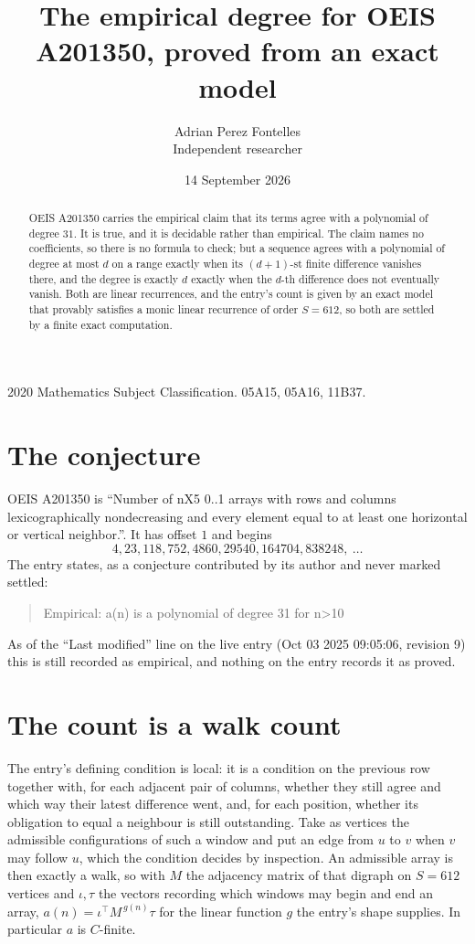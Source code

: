 \documentclass[11pt,a4paper]{article}
\title{The empirical degree for OEIS A201350, proved from an exact model}
\author{Adrian Perez Fontelles\\ \small Independent researcher}
\date{14 September 2026}
\theoremstyle{plain}
\theoremstyle{definition}
\begin{document}
\maketitle

\begin{abstract}
OEIS A201350 carries the empirical claim that its terms agree with a polynomial of degree $31$.
It is true, and it is decidable rather than empirical. The claim names no coefficients, so
there is no formula to check; but a sequence agrees with a polynomial of degree at most $d$ on
a range exactly when its $(d+1)$-st finite difference vanishes there, and the degree is exactly
$d$ exactly when the $d$-th difference does not eventually vanish. Both are linear recurrences,
and the entry's count is given by an exact model that provably satisfies a monic linear
recurrence of order $S=612$, so both are settled by a finite exact computation.
\end{abstract}

\noindent\small 2020 Mathematics Subject Classification. 05A15, 05A16, 11B37.\normalsize

\section{The conjecture}

OEIS A201350 is ``Number of nX5 0..1 arrays with rows and columns lexicographically nondecreasing and every element equal to at least one horizontal or vertical neighbor.''. It has offset $1$ and begins
\[
4, 23, 118, 752, 4860, 29540, 164704, 838248,\ \dots
\]
The entry states, as a conjecture contributed by its author and never marked settled:
\begin{quote}
Empirical: a(n) is a polynomial of degree 31 for n>10
\end{quote}
As of the ``Last modified'' line on the live entry (Oct 03 2025 09:05:06, revision 9)
this is still recorded as empirical, and nothing on the entry records it as proved.

\section{The count is a walk count}

The entry's defining condition is local: it is a condition on the previous row together with, for each adjacent pair of columns, whether they still agree and which way their latest difference went, and, for each position, whether its obligation to equal a neighbour is still outstanding. Take as vertices the
admissible configurations of such a window and put an edge from $u$ to $v$ when $v$ may follow
$u$, which the condition decides by inspection. An admissible array is then exactly a walk, so
with $M$ the adjacency matrix of that digraph on $S=612$ vertices and $\iota,\tau$ the vectors
recording which windows may begin and end an array, $a(n)=\iota^{\!\top}M^{\,g(n)}\tau$ for
the linear function $g$ the entry's shape supplies. In particular $a$ is $C$-finite.
\end{document}
